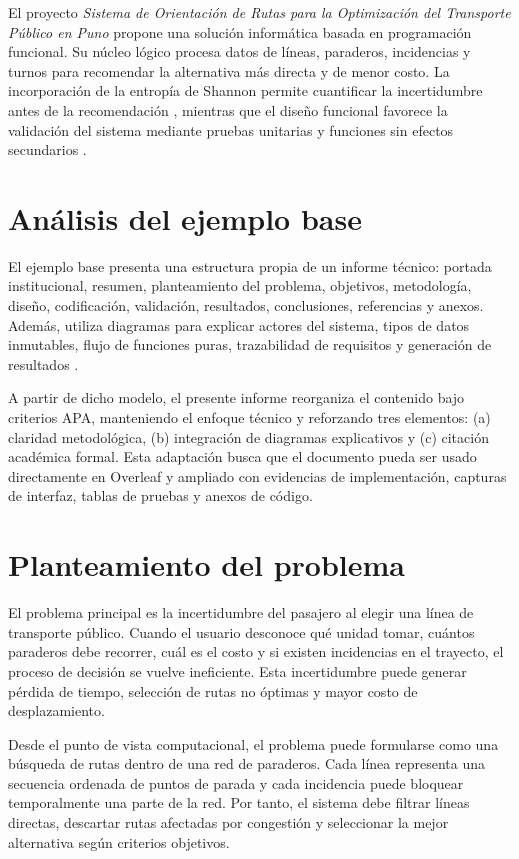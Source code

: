 \documentclass[stu,12pt,floatsintext]{apa7}
\begin{document}
El proyecto \textit{Sistema de Orientación de Rutas para la Optimización del Transporte Público en Puno} propone una solución informática basada en programación funcional. Su núcleo lógico procesa datos de líneas, paraderos, incidencias y turnos para recomendar la alternativa más directa y de menor costo. La incorporación de la entropía de Shannon permite cuantificar la incertidumbre antes de la recomendación \parencite{shannon1948}, mientras que el diseño funcional favorece la validación del sistema mediante pruebas unitarias y funciones sin efectos secundarios \parencite{hughes1989}.

\section{Análisis del ejemplo base}
El ejemplo base presenta una estructura propia de un informe técnico: portada institucional, resumen, planteamiento del problema, objetivos, metodología, diseño, codificación, validación, resultados, conclusiones, referencias y anexos. Además, utiliza diagramas para explicar actores del sistema, tipos de datos inmutables, flujo de funciones puras, trazabilidad de requisitos y generación de resultados \parencite{pongo2026}.

A partir de dicho modelo, el presente informe reorganiza el contenido bajo criterios APA, manteniendo el enfoque técnico y reforzando tres elementos: (a) claridad metodológica, (b) integración de diagramas explicativos y (c) citación académica formal. Esta adaptación busca que el documento pueda ser usado directamente en Overleaf y ampliado con evidencias de implementación, capturas de interfaz, tablas de pruebas y anexos de código.

\section{Planteamiento del problema}
El problema principal es la incertidumbre del pasajero al elegir una línea de transporte público. Cuando el usuario desconoce qué unidad tomar, cuántos paraderos debe recorrer, cuál es el costo y si existen incidencias en el trayecto, el proceso de decisión se vuelve ineficiente. Esta incertidumbre puede generar pérdida de tiempo, selección de rutas no óptimas y mayor costo de desplazamiento.

Desde el punto de vista computacional, el problema puede formularse como una búsqueda de rutas dentro de una red de paraderos. Cada línea representa una secuencia ordenada de puntos de parada y cada incidencia puede bloquear temporalmente una parte de la red. Por tanto, el sistema debe filtrar líneas directas, descartar rutas afectadas por congestión y seleccionar la mejor alternativa según criterios objetivos.
\end{document}
